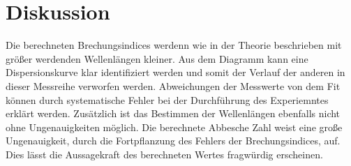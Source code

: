 \section{Diskussion}
\label{sec:Diskussion}

Die berechneten Brechungsindices werdenn wie in der Theorie beschrieben mit größer werdenden Wellenlängen kleiner.
Aus dem Diagramm kann eine Dispersionskurve klar identifiziert werden und somit der Verlauf der anderen in dieser
Messreihe verworfen werden. Abweichungen der Messwerte von dem Fit können durch systematische Fehler bei der Durchführung des
Experiemntes erklärt werden. Zusätzlich ist das Bestimmen der Wellenlängen ebenfalls nicht ohne Ungenauigkeiten möglich.
Die berechnete Abbesche Zahl weist eine große Ungenauigkeit, durch die Fortpflanzung des Fehlers der Brechungsindices, auf. Dies lässt die
Aussagekraft des berechneten Wertes fragwürdig erscheinen.
